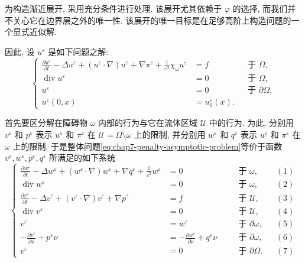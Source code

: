\begin{sloppypar}
为构造渐近展开, 采用充分条件进行处理. 该展开尤其依赖于 $\varphi$ 的选择, 而我们并不关心它在边界层之外的唯一性. 该展开的唯一目标是在足够高阶上构造问题的一个显式近似解.

因此, 设 $u^\varepsilon$ 是如下问题之解:
\begin{equation}
\left\{
\begin{aligned}
 \frac{\partial u^\varepsilon}{\partial t}-\Delta u^\varepsilon
 +(u^\varepsilon\cdot\nabla)u^\varepsilon+\nabla\pi^\varepsilon
 +\frac1{\varepsilon^2}\chi_\omega u^\varepsilon&=f&&\text{于 }\Omega,\\
 \operatorname{div}u^\varepsilon&=0&&\text{于 }\Omega,\\
 u^\varepsilon&=0&&\text{于 }\partial\Omega,\\
 u^\varepsilon(0,x)&=u_0^\varepsilon(x).
\end{aligned}
\right.
\label{eq:chap7-penalty-asymptotic-problem}
\end{equation}

首先要区分解在障碍物 $\omega$ 内部的行为与它在流体区域 $\mathcal U$ 中的行为. 为此, 分别用 $v^\varepsilon$ 和 $p^\varepsilon$ 表示 $u^\varepsilon$ 和 $\pi^\varepsilon$ 在 $\mathcal U=\Omega\setminus\overline\omega$ 上的限制, 并分别用 $w^\varepsilon$ 和 $q^\varepsilon$ 表示 $u^\varepsilon$ 和 $\pi^\varepsilon$ 在 $\omega$ 上的限制. 于是整体问题\eqref{eq:chap7-penalty-asymptotic-problem}等价于函数 $v^\varepsilon,w^\varepsilon,p^\varepsilon,q^\varepsilon$ 所满足的如下系统
\begin{equation}
\left\{
\begin{alignedat}{3}
 \frac{\partial w^\varepsilon}{\partial t}-\Delta w^\varepsilon
 +(w^\varepsilon\cdot\nabla)w^\varepsilon+\nabla q^\varepsilon
 +\frac1{\varepsilon^2}w^\varepsilon&=0&&\quad\text{于 }\omega,&&(1)\\
 \operatorname{div}w^\varepsilon&=0&&\quad\text{于 }\omega,&&(2)\\
 \frac{\partial v^\varepsilon}{\partial t}-\Delta v^\varepsilon
 +(v^\varepsilon\cdot\nabla)v^\varepsilon+\nabla p^\varepsilon&=f&&\quad\text{于 }\mathcal U,&&(3)\\
 \operatorname{div}v^\varepsilon&=0&&\quad\text{于 }\mathcal U,&&(4)\\
 v^\varepsilon&=w^\varepsilon&&\quad\text{于 }\partial\omega,&&(5)\\
 -\frac{\partial v^\varepsilon}{\partial\nu}+p^\varepsilon\nu
 &=-\frac{\partial w^\varepsilon}{\partial\nu}+q^\varepsilon\nu
 &&\quad\text{于 }\partial\omega,&&(6)\\
 v^\varepsilon&=0&&\quad\text{于 }\partial\Omega.&&(7)
\end{alignedat}
\right.
\label{eq:chap7-penalty-transmission-system}
\end{equation}


\end{sloppypar}
